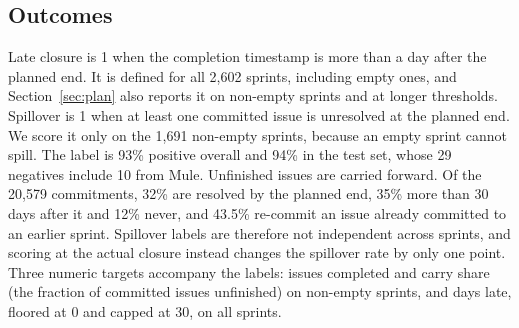 \documentclass[conference]{IEEEtran}
\begin{document}
\subsection{Outcomes}

Late closure is 1 when the completion timestamp is more than a day after the planned end. It is defined for all 2,602 sprints, including empty ones, and Section~\ref{sec:plan} also reports it on non-empty sprints and at longer thresholds. Spillover is 1 when at least one committed issue is unresolved at the planned end. We score it only on the 1,691 non-empty sprints, because an empty sprint cannot spill. The label is 93\% positive overall and 94\% in the test set, whose 29 negatives include 10 from Mule. Unfinished issues are carried forward. Of the 20,579 commitments, 32\% are resolved by the planned end, 35\% more than 30 days after it and 12\% never, and 43.5\% re-commit an issue already committed to an earlier sprint. Spillover labels are therefore not independent across sprints, and scoring at the actual closure instead changes the spillover rate by only one point. Three numeric targets accompany the labels: issues completed and carry share (the fraction of committed issues unfinished) on non-empty sprints, and days late, floored at 0 and capped at 30, on all sprints.
\end{document}
